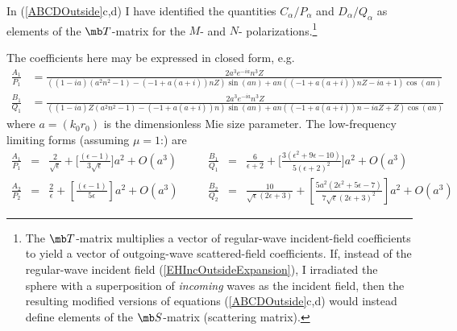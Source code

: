 \documentclass[letterpaper]{article}
\begin{document}
In (\ref{ABCDOutside}c,d) I have identified
the quantities $C_\alpha/P_\alpha$ and $D_\alpha/Q_\alpha$
as elements of the $\mb T$-matrix for the $M$- and $N$- 
polarizations.\footnote{The $\mb T$-matrix multiplies a vector
of regular-wave incident-field coefficients to yield 
a vector of outgoing-wave scattered-field coefficients.
If, instead of the regular-wave incident field 
(\ref{EHIncOutsideExpansion}), I irradiated the sphere with
a superposition of \textit{incoming} waves as the incident field,
then the resulting modified versions of equations (\ref{ABCDOutside}c,d)
would instead define elements of the $\mb S$-matrix (scattering matrix).}

The coefficients here may be expressed in closed form, e.g.
\begin{align*}
 \frac{A_1}{P_1}
&=
   \frac{2 a^3 e^{-i a} n^3 Z}{\left((1-i a) \left(a^2 n^2-1\right)-(-1+a (a+i))
    n Z\right) \sin (a n)+a n ((-1+a (a+i)) n Z-i a+1) \cos (a n)}
\\
 \frac{B_1}{Q_1}
&=
  \frac{2 a^3 e^{-i a} n^3 Z}{\left((1-i a) Z \left(a^2 n^2-1\right)-(-1+a
    (a+i)) n\right) \sin (a n)+a n ((-1+a (a+i)) n-i a Z+Z) \cos (a n)}
\end{align*}
where $a=(k_0 r_0)$ is the dimensionless Mie size parameter.
The low-frequency limiting forms (assuming $\mu=1$:) are 
$$ \begin{array}{lclclcl}
 \displaystyle{
 \frac{A_1}{P_1}
              }
&=& 
 \displaystyle{
   \frac{2}{\sqrt{\epsilon}}
   +
   \Big[\frac{(\epsilon-1)}{3\sqrt{\epsilon}}\Big] a^2
   +O(a^3)
              }
&\quad&
 \displaystyle{
 \frac{B_1}{Q_1}
              }
&=& 
 \displaystyle{
    \frac{6}{\epsilon+2}
   +
   \Big[
   \frac{3 \left(\epsilon^2+9\epsilon-10\right)}{5 (\epsilon+2)^2}
   \Big]a^2
   +O(a^3)
              }
\\[12pt]
 \displaystyle{
\frac{A_2}{P_2}
              }
&=&
 \displaystyle{
   \frac{2}{\epsilon}
   +\left[ \frac{(\epsilon-1)}{5\epsilon}\right]a^2
   +O(a^3)
              }
&\quad&
 \displaystyle{
\frac{B_2}{Q_2}
              }
&=&
 \displaystyle{
   \frac{10}{\sqrt{\epsilon} (2 \epsilon+3)}
  +
   \left[ \frac{5 a^2 \left(2\epsilon^2+5 \epsilon-7\right)}
               {7 \sqrt{\epsilon} (2 \epsilon+3)^2}
   \right] a^2 
  +O(a^3)
              }
\end{array}$$
\end{document}
